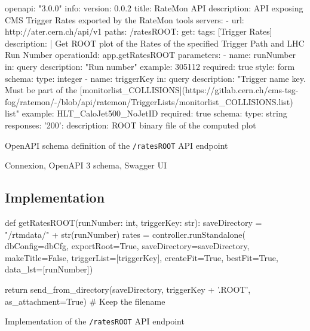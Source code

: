 \begin{listing}[ht]
\begin{yamlcode}
openapi: "3.0.0"
info:
  version: 0.0.2
  title: RateMon API
  description: API exposing CMS Trigger Rates exported by the RateMon tools
servers:
  - url: http://ater.cern.ch/api/v1
paths:
  /ratesROOT:
    get:
      tags: [Trigger Rates]
      description: |
        Get ROOT plot of the Rates of the specified Trigger Path and LHC Run Number
      operationId: app.getRatesROOT
      parameters:
        - name: runNumber
          in: query
          description: "Run number"
          example: 305112
          required: true
          style: form
          schema:
            type: integer
        - name: triggerKey
          in: query
          description: "Trigger name key. Must be part of the [monitorlist_COLLISIONS](https://gitlab.cern.ch/cms-tsg-fog/ratemon/-/blob/api/ratemon/TriggerLists/monitorlist_COLLISIONS.list) list"
          example: HLT_CaloJet500_NoJetID
          required: true
          schema:
            type: string
      responses:
        '200':
          description: ROOT binary file of the computed plot
\end{yamlcode}
\caption{OpenAPI schema definition of the \texttt{/ratesROOT} API endpoint}
\end{listing}

Connexion, OpenAPI 3 schema, Swagger UI

\subsection{Implementation}

\begin{listing}[ht]
\begin{pythoncode}
def getRatesROOT(runNumber: int, triggerKey: str):
    saveDirectory = "/rtmdata/" + str(runNumber)
    rates = controller.runStandalone(
                         dbConfig=dbCfg,
                         exportRoot=True,
                         saveDirectory=saveDirectory,
                         makeTitle=False,
                         triggerList=[triggerKey],
                         createFit=True,
                         bestFit=True,
                         data_lst=[runNumber])

    return send_from_directory(saveDirectory,
                               triggerKey + '.ROOT',
                               as_attachment=True) # Keep the filename
\end{pythoncode}
\caption{Implementation of the \texttt{/ratesROOT} API endpoint}
\end{listing}

